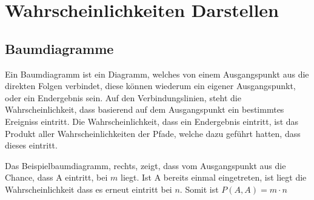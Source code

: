 \documentclass{article}
\begin{document}
 

\section{Wahrscheinlichkeiten Darstellen} 
\subsection{Baumdiagramme}
\begin{minipage}{\dimexpr\linewidth-5cm} 
Ein Baumdiagramm ist ein Diagramm, welches von einem Ausgangspunkt aus die direkten Folgen verbindet, diese können wiederum ein eigener Ausgangspunkt, oder ein Endergebnis sein. Auf den Verbindungslinien, steht die Wahrscheinlichkeit, dass basierend auf dem Ausgangspunkt ein bestimmtes Ereigniss eintritt. Die Wahrscheinlichkeit, dass ein Endergebnis eintritt, ist das Produkt aller Wahrscheinlichkeiten der Pfade, welche dazu geführt hatten, dass dieses eintritt.
\end{minipage}
\hfill
\begin{minipage}{5cm}
 \center
\end{minipage}
\vspace{-0.35em} \newline
Das Beispielbaumdiagramm, rechts, zeigt, dass vom Ausgangspunkt aus die Chance, dass A eintritt, bei $m$ liegt. Ist A bereits einmal eingetreten, ist liegt die Wahrscheinlichkeit dass es erneut eintritt bei $n$. Somit ist $P(A, A) = m \cdot n$ 
 
\end{document}
